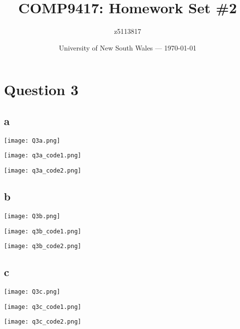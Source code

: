 \documentclass{article}
\title{COMP9417: Homework Set \#2} %
\author{z5113817} %
\date{University of New South Wales --- \today} %
\begin{document}




\section*{Question 3}

\subsection*{a}

\texttt{[image: Q3a.png]}

\texttt{[image: q3a\_code1.png]}

\texttt{[image: q3a\_code2.png]}

\subsection*{b}

\texttt{[image: Q3b.png]}

\texttt{[image: q3b\_code1.png]}

\texttt{[image: q3b\_code2.png]}

\subsection*{c}

\texttt{[image: Q3c.png]}

\texttt{[image: q3c\_code1.png]}

\texttt{[image: q3c\_code2.png]}
\end{document}
